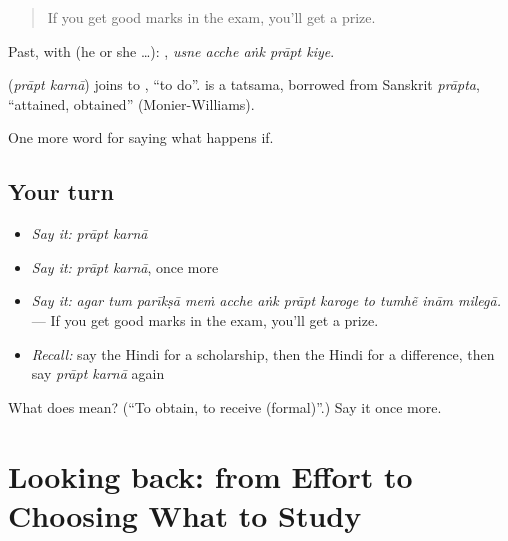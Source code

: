 \begin{quote}
If you get good marks in the exam, you'll get a prize.
\end{quote}

Past, with  (he or she …):     , \emph{usne acche aṅk prāpt kiye}.

\begin{cousinweb}
\textbf{ } (\emph{prāpt karnā}) joins  to , \textquotedblleft{}to do\textquotedblright{}.  is a tatsama, borrowed from Sanskrit \emph{prāpta}, \textquotedblleft{}attained, obtained\textquotedblright{} (Monier-Williams).
\end{cousinweb}

\begin{grammarlens}[title={What you've built}]
One more word for saying what happens if.
\end{grammarlens}

\subsection*{Your turn}
\begin{itemize}
\raggedright
  \item \emph{Say it:} \emph{prāpt karnā}
  \item \emph{Say it:} \emph{prāpt karnā}, once more
  \item \emph{Say it:} \emph{agar tum parīkṣā meṁ acche aṅk prāpt karoge to tumhẽ inām milegā.} — If you get good marks in the exam, you'll get a prize.
  \item \emph{Recall:} say the Hindi for a scholarship, then the Hindi for a difference, then say \emph{prāpt karnā} again
\end{itemize}

\begin{tcolorbox}[breakable,colback=teal!4,colframe=teal!35!black,title={Before you move on}]
What does   mean? (\textquotedblleft{}To obtain, to receive (formal)\textquotedblright{}.) Say it once more.
\end{tcolorbox}
\section[(dialogue)]{Looking back: from Effort to Choosing What to Study}

\label{lesson:HI-R397-review-391-397}



